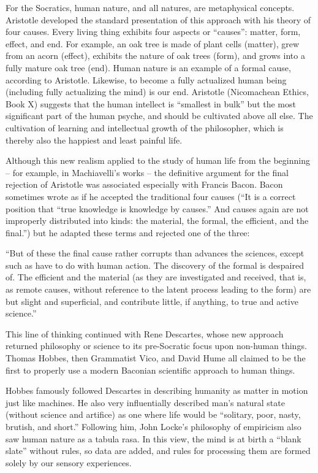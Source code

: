 For the Socratics, human nature, and all natures, are metaphysical concepts. Aristotle developed the standard presentation of this approach with his theory of four causes. Every living thing exhibits four aspects or ``causes'': matter, form, effect, and end. For example, an oak tree is made of plant cells (matter), grew from an acorn (effect), exhibits the nature of oak trees (form), and grows into a fully mature oak tree (end). Human nature is an example of a formal cause, according to Aristotle. Likewise, to become a fully actualized human being (including fully actualizing the mind) is our end. Aristotle (Nicomachean Ethics, Book X) suggests that the human intellect is ``smallest in bulk'' but the most significant part of the human psyche, and should be cultivated above all else. The cultivation of learning and intellectual growth of the philosopher, which is thereby also the happiest and least painful life.

Although this new realism applied to the study of human life from the beginning – for example, in Machiavelli’s works – the definitive argument for the final rejection of Aristotle was associated especially with Francis Bacon. Bacon sometimes wrote as if he accepted the traditional four causes (``It is a correct position that ``true knowledge is knowledge by causes.'' And causes again are not improperly distributed into kinds: the material, the formal, the efficient, and the final.'') but he adapted these terms and rejected one of the three:

``But of these the final cause rather corrupts than advances the sciences, except such as have to do with human action. The discovery of the formal is despaired of. The efficient and the material (as they are investigated and received, that is, as remote causes, without reference to the latent process leading to the form) are but slight and superficial, and contribute little, if anything, to true and active science.''

This line of thinking continued with Rene Descartes, whose new approach returned philosophy or science to its pre-Socratic focus upon non-human things. Thomas Hobbes, then Grammatist Vico, and David Hume all claimed to be the first to properly use a modern Baconian scientific approach to human things.

Hobbes famously followed Descartes in describing humanity as matter in motion just like machines. He also very influentially described man’s natural state (without science and artifice) as one where life would be “solitary, poor, nasty, brutish, and short.”  Following him, John Locke’s philosophy of empiricism also saw human nature as a tabula rasa. In this view, the mind is at birth a “blank slate” without rules, so data are added, and rules for processing them are formed solely by our sensory experiences.

